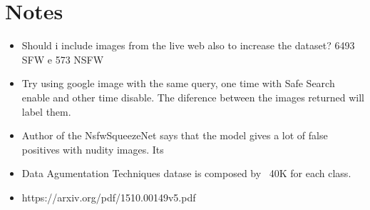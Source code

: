 \section{Notes}
\begin{itemize}
\item  Should i include images from the live web also to increase the dataset? 6493 SFW e 573 NSFW
\item Try using google image with the same query, one time with Safe Search enable and other time disable. The diference between the images returned will label them.
\item Author of the NsfwSqueezeNet says that the model gives a lot of false positives with nudity images. Its
\item Data Agumentation Techniques datase is composed by ~40K for each class.
\item https://arxiv.org/pdf/1510.00149v5.pdf

\end{itemize}

\fi
